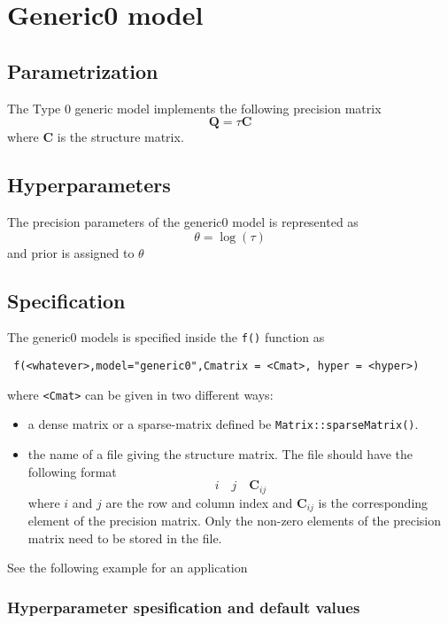 \documentclass[a4paper,11pt]{article}
\begin{document}
\section*{Generic0 model}

\subsection*{Parametrization}

The Type 0 generic model implements the following precision matrix
\begin{displaymath}
    \mathbf{Q}=\tau\mathbf{C}
\end{displaymath}
where $\mathbf{C}$ is the structure matrix.

\subsection*{Hyperparameters}

The precision parameters of the generic0 model is represented as
\begin{displaymath}
    \theta = \log(\tau)
\end{displaymath}
and prior is assigned to $\theta$

\subsection*{Specification}

The generic0 models is specified inside the {\tt f()} function as
\begin{verbatim}
 f(<whatever>,model="generic0",Cmatrix = <Cmat>, hyper = <hyper>)
\end{verbatim}


where {\tt <Cmat>} can be given in two different ways:
\begin{itemize}
\item a dense matrix or a sparse-matrix defined be
    \texttt{Matrix::sparseMatrix()}.
\item the name of a file giving the structure matrix. The file should
    have the following format
    \[
    i\quad j\quad \mathbf{C}_{ij}
    \]
    where $i$ and $j$ are the row and column index and
    $\mathbf{C}_{ij}$ is the corresponding element of the precision
    matrix. Only the non-zero elements of the precision matrix need to
    be stored in the file.  
\end{itemize}
See the following example for an application

\subsubsection*{Hyperparameter spesification and default values}

\end{document}
